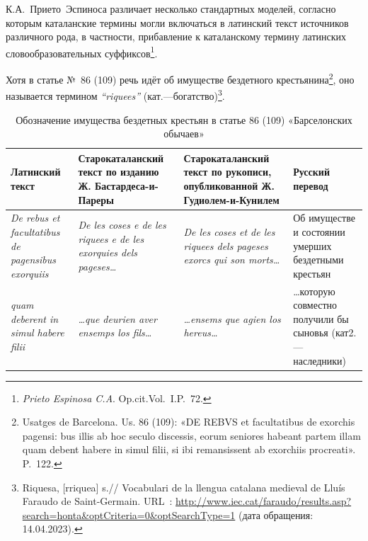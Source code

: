 К.А.~Прието~Эспиноса различает несколько стандартных моделей, согласно которым каталанские термины могли включаться в латинский текст источников различного рода, в частности, прибавление к каталанскому термину латинских словообразовательных суффиксов\footnote{\emph{Prieto Espinosa C.A}. Op.cit.Vol.~I.P.~72.}.

Хотя в статье №~86 (109) речь идёт об имуществе бездетного крестьянина\footnote{Usatges de Barcelona. Us. 86 (109): «DE REBVS et facultatibus de exorchis pagensi: bus illis ab hoc seculo discessis, eorum seniores habeant partem illam quam debent habere in simul filii, si ibi remansissent ab exorchiis procreati». P.~122.}, оно называется термином \emph{“}\emph{riquees}\emph{”} (кат.---богатство)\footnote{Riquesa, [rriquea] s.// Vocabulari de la llengua catalana medieval de Lluís Faraudo de Saint-Germain. URL~: \url{http://www.iec.cat/faraudo/results.asp?search=honta&optCriteria=0&optSearchType=1} (дата обращения: 14.04.2023).}.

\begin{center}
\small
\setlength{\tabcolsep}{2pt}
\begin{longtable}{|p{}|p{}|p{}|p{}|}
\caption{Обозначение имущества бездетных крестьян в статье 86 (109) «Барселонских обычаев»}\label{tab:ch2-childless-property}\\
\hline
\textbf{Латинский текст} & \textbf{Старокаталанский текст по изданию Ж. Бастардеса-и-Пареры} & \textbf{Старокаталанский текст по рукописи, опубликованной Ж. Гудиолем-и-Кунилем} & \textbf{Русский перевод} \\ \hline
\emph{De rebus et facultatibus de pagensibus exorquiis} & \emph{De les coses e de les riquees e de les exorquies dels pageses…} & \emph{De les coses et de les riquees dels pageses exorcs qui son morts…} & Об имуществе и состоянии умерших бездетными крестьян \\ \hline
\emph{quam deberent in simul habere filii} & \emph{…que deurien aver ensemps los fils…} & \emph{…ensems que agien los hereus…} & …которую совместно получили бы сыновья (кат2.--- наследники) \\ \hline
\end{longtable}
\end{center}

